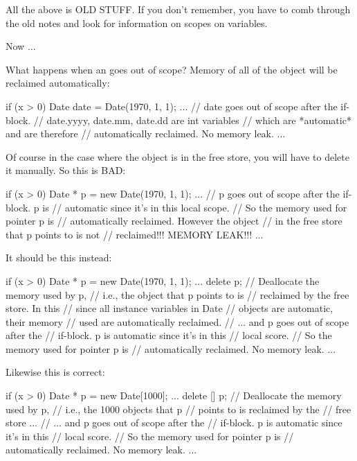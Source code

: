 All the above is OLD STUFF. If you don't remember, you
have to comb through the old notes and look for information on scopes on
variables.

Now ...


\newpage{}

What happens when an  goes out of scope? Memory of all
 of the object will be reclaimed
automatically:

\begin{consolethree}[escapeinside=||]
if (x > 0)
{
    Date date = Date(1970, 1, 1);
    ...
} // date goes out of scope after the if-block.
  // date.yyyy, date.mm, date.dd are int variables
  // which are *automatic* and are therefore
  // automatically reclaimed. No memory leak.
...
\end{consolethree}

Of course in the case where the object is in the free store, you will
have to delete it manually. So this is BAD:

\begin{consolethree}[escapeinside=||]
if (x > 0)
{
    Date * p = new Date(1970, 1, 1);
    ...
} // p goes out of scope after the if-block. p is
  // automatic since it's in this local scope.
  // So the memory used for pointer p is
  // automatically reclaimed. However the object
  // in the free store that p points to is not
  // reclaimed!!! MEMORY LEAK!!!
...
\end{consolethree}

It should be this instead:

\begin{consolethree}[escapeinside=||]
if (x > 0)
{
    Date * p = new Date(1970, 1, 1);
    ...
    delete p; // Deallocate the memory used by p,
              // i.e., the object that p points to is
              // reclaimed by the free store. In this
              // since all instance variables in Date
              // objects are automatic, their memory
              // used are automatically reclaimed.
} // ... and p goes out of scope after the
  // if-block. p is automatic since it's in this
  // local score.
  // So the memory used for pointer p is
  // automatically reclaimed. No memory leak.
...
\end{consolethree}

Likewise this is correct:

\begin{consolethree}[escapeinside=||]
if (x > 0)
{
    Date * p = new Date[1000];
    ...
    delete [] p; // Deallocate the memory used by p,
                 // i.e., the 1000 objects that p
                 // points to is reclaimed by the
                 // free store ...
} // ... and p goes out of scope after the
  // if-block. p is automatic since it's in this
  // local score.
  // So the memory used for pointer p is
  // automatically reclaimed. No memory leak.
...
\end{consolethree}


